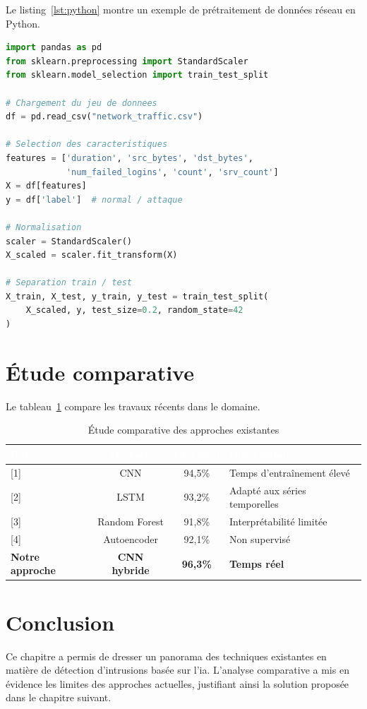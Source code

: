 Le listing~\ref{lst:python} montre un exemple de prétraitement de données réseau en Python.

\begin{lstlisting}[language=Python, caption={Prétraitement des données réseau}, label={lst:python}]
import pandas as pd
from sklearn.preprocessing import StandardScaler
from sklearn.model_selection import train_test_split

# Chargement du jeu de donnees
df = pd.read_csv("network_traffic.csv")

# Selection des caracteristiques
features = ['duration', 'src_bytes', 'dst_bytes',
            'num_failed_logins', 'count', 'srv_count']
X = df[features]
y = df['label']  # normal / attaque

# Normalisation
scaler = StandardScaler()
X_scaled = scaler.fit_transform(X)

# Separation train / test
X_train, X_test, y_train, y_test = train_test_split(
    X_scaled, y, test_size=0.2, random_state=42
)
\end{lstlisting}

\section{Étude comparative}
\label{sec:comparative}

Le tableau~\ref{tab:comparative} compare les travaux récents dans le domaine.

\begin{table}[H]
  \centering
  \caption{Étude comparative des approches existantes}
  \label{tab:comparative}
  \renewcommand{\arraystretch}{1.3}
  \small
  \begin{tabularx}{\textwidth}{|l|c|c|X|}
    \hline
    \rowcolor{iacsTableHead}
    \textcolor{white}{\textbf{Réf.}} & 
    \textcolor{white}{\textbf{Méthode}} & 
    \textcolor{white}{\textbf{Précision}} & 
    \textcolor{white}{\textbf{Observations}} \\
    \hline
    {[1]} & CNN & 94,5\% & Temps d'entraînement élevé \\
    \hline
    \rowcolor{iacsLightGray}
    {[2]} & LSTM & 93,2\% & Adapté aux séries temporelles \\
    \hline
    {[3]} & Random Forest & 91,8\% & Interprétabilité limitée \\
    \hline
    \rowcolor{iacsLightGray}
    {[4]} & Autoencoder & 92,1\% & Non supervisé \\
    \hline
    \textbf{Notre approche} & \textbf{CNN hybride} & \textbf{96,3\%} & \textbf{Temps réel} \\
    \hline
  \end{tabularx}
\end{table}

\section*{Conclusion}

Ce chapitre a permis de dresser un panorama des techniques existantes en matière de détection d'intrusions basée sur l'\gls{ia}. L'analyse comparative a mis en évidence les limites des approches actuelles, justifiant ainsi la solution proposée dans le chapitre suivant.

